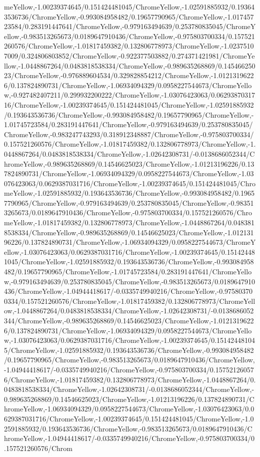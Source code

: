 {\begin{tikzternal}
{meYellow,-1.00239374645/0.151424481045/ChromeYellow,-1.02591885932/0.193643536736/ChromeYellow,-0.993084958482/0.19657790965/ChromeYellow,-1.01745723584/0.283191447641/ChromeYellow,-0.979163494639/0.253780835045/ChromeYellow,-0.983513265673/0.0189647910436/ChromeYellow,-0.975803700334/0.157521260576/ChromeYellow,-1.01817459382/0.132806778973/ChromeYellow,-1.02375107009/0.324806803852/ChromeYellow,-0.922377503882/0.274371421981/ChromeYellow,-1.0448867264/0.0483818538334/ChromeYellow,-0.989635268869/0.14546625023/ChromeYellow,-0.976889604534/0.329828854212/ChromeYellow,-1.01213196226/0.137824890731/ChromeYellow,-1.06934094329/0.0958227544673/ChromeYellow,-0.927482407211/0.299932200222/ChromeYellow,-1.03076423063/0.0629387031716/ChromeYellow,-1.00239374645/0.151424481045/ChromeYellow,-1.02591885932/0.193643536736/ChromeYellow,-0.993084958482/0.19657790965/ChromeYellow,-1.01745723584/0.283191447641/ChromeYellow,-0.979163494639/0.253780835045/ChromeYellow,-0.983247743293/0.318912348887/ChromeYellow,-0.975803700334/0.157521260576/ChromeYellow,-1.01817459382/0.132806778973/ChromeYellow,-1.0448867264/0.0483818538334/ChromeYellow,-1.02642308731/-0.0138686052344/ChromeYellow,-0.989635268869/0.14546625023/ChromeYellow,-1.01213196226/0.137824890731/ChromeYellow,-1.06934094329/0.0958227544673/ChromeYellow,-1.03076423063/0.0629387031716/ChromeYellow,-1.00239374645/0.151424481045/ChromeYellow,-1.02591885932/0.193643536736/ChromeYellow,-0.993084958482/0.19657790965/ChromeYellow,-0.979163494639/0.253780835045/ChromeYellow,-0.983513265673/0.0189647910436/ChromeYellow,-0.975803700334/0.157521260576/ChromeYellow,-1.01817459382/0.132806778973/ChromeYellow,-1.0448867264/0.0483818538334/ChromeYellow,-0.989635268869/0.14546625023/ChromeYellow,-1.01213196226/0.137824890731/ChromeYellow,-1.06934094329/0.0958227544673/ChromeYellow,-1.03076423063/0.0629387031716/ChromeYellow,-1.00239374645/0.151424481045/ChromeYellow,-1.02591885932/0.193643536736/ChromeYellow,-0.993084958482/0.19657790965/ChromeYellow,-1.01745723584/0.283191447641/ChromeYellow,-0.979163494639/0.253780835045/ChromeYellow,-0.983513265673/0.0189647910436/ChromeYellow,-1.04944418617/-0.0335749940216/ChromeYellow,-0.975803700334/0.157521260576/ChromeYellow,-1.01817459382/0.132806778973/ChromeYellow,-1.0448867264/0.0483818538334/ChromeYellow,-1.02642308731/-0.0138686052344/ChromeYellow,-0.989635268869/0.14546625023/ChromeYellow,-1.01213196226/0.137824890731/ChromeYellow,-1.06934094329/0.0958227544673/ChromeYellow,-1.03076423063/0.0629387031716/ChromeYellow,-1.00239374645/0.151424481045/ChromeYellow,-1.02591885932/0.193643536736/ChromeYellow,-0.993084958482/0.19657790965/ChromeYellow,-0.983513265673/0.0189647910436/ChromeYellow,-1.04944418617/-0.0335749940216/ChromeYellow,-0.975803700334/0.157521260576/ChromeYellow,-1.01817459382/0.132806778973/ChromeYellow,-1.0448867264/0.0483818538334/ChromeYellow,-1.02642308731/-0.0138686052344/ChromeYellow,-0.989635268869/0.14546625023/ChromeYellow,-1.01213196226/0.137824890731/ChromeYellow,-1.06934094329/0.0958227544673/ChromeYellow,-1.03076423063/0.0629387031716/ChromeYellow,-1.00239374645/0.151424481045/ChromeYellow,-1.02591885932/0.193643536736/ChromeYellow,-0.983513265673/0.0189647910436/ChromeYellow,-1.04944418617/-0.0335749940216/ChromeYellow,-0.975803700334/0.157521260576/Chrom}
\end{tikzternal}}
